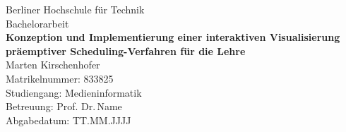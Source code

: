 \begin{titlepage}
    \begin{center}
        {\LARGE Berliner Hochschule für Technik\\}
        \vspace{1cm}
        {\Large Bachelorarbeit\\}
        \vspace{2cm}
        {\huge\textbf{Konzeption und Implementierung einer interaktiven Visualisierung präemptiver
                Scheduling-Verfahren für die Lehre }\\}
        \vfill
        {Marten Kirschenhofer\\
            Matrikelnummer: 833825\\
            Studiengang: Medieninformatik\\}
        \vspace{1cm}
        {Betreuung: Prof. Dr.\,Name\\
            Abgabedatum: TT.MM.JJJJ}
    \end{center}
\end{titlepage}
